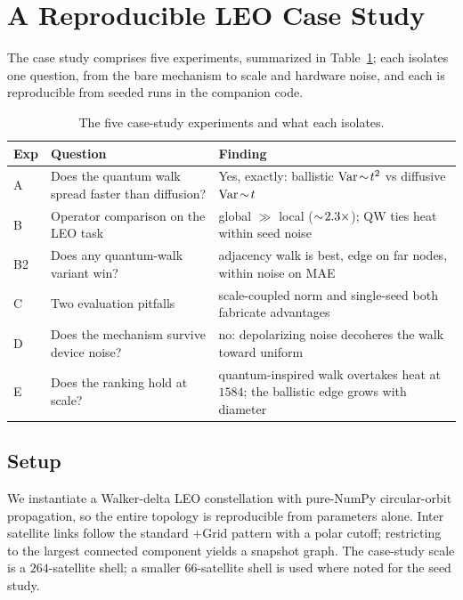 \section{A Reproducible LEO Case Study}
\label{sec:casestudy}

The case study comprises five experiments, summarized in Table~\ref{tab:expsummary};
each isolates one question, from the bare mechanism to scale and hardware noise, and each
is reproducible from seeded runs in the companion code.

\begin{table}[t]
\centering
\caption{The five case-study experiments and what each isolates.}
\label{tab:expsummary}
\renewcommand{\arraystretch}{1.25}
\footnotesize
\begin{tabular}{@{}p{}p{}p{}@{}}
\toprule
Exp & Question & Finding \\
\midrule
A & Does the quantum walk spread faster than diffusion? & Yes, exactly: ballistic
$\operatorname{Var}\!\sim\!t^2$ vs diffusive $\operatorname{Var}\!\sim\!t$ \\
B & Operator comparison on the LEO task & global $\gg$ local ($\sim\!2.3\times$);
QW ties heat within seed noise \\
B2 & Does any quantum-walk variant win? & adjacency walk is best, edge on far nodes,
within noise on MAE \\
C & Two evaluation pitfalls & scale-coupled norm and single-seed both fabricate
advantages \\
D & Does the mechanism survive device noise? & no: depolarizing noise decoheres the
walk toward uniform \\
E & Does the ranking hold at scale? & quantum-inspired walk overtakes heat at $1584$;
the ballistic edge grows with diameter \\
\bottomrule
\end{tabular}
\end{table}

\subsection{Setup}
We instantiate a Walker-delta LEO constellation with pure-NumPy circular-orbit
propagation, so the entire topology is reproducible from parameters alone. Inter
satellite links follow the standard $+$Grid pattern with a polar cutoff; restricting
to the largest connected component yields a snapshot graph. The case-study scale is a
$264$-satellite shell; a smaller $66$-satellite shell is used where noted for the
seed study.

